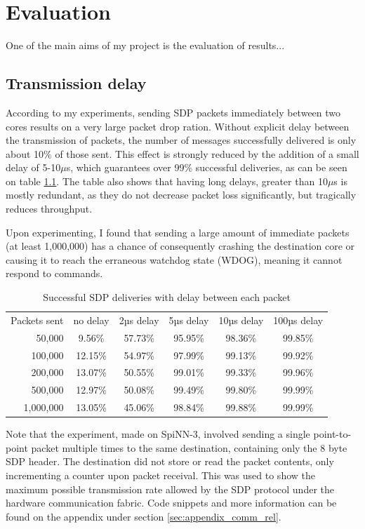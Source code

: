 \chapter{Evaluation}
\label{cha:eval}
One of the main aims of my project is the evaluation of results...

\section{Transmission delay}
\label{sec:eval_comm_rel}

According to my experiments, sending SDP packets immediately between two cores results on a very large packet drop ration. Without explicit delay between the transmission of packets, the number of messages successfully delivered is only about 10\% of those sent. This effect is strongly reduced by the addition of a small delay of 5-10$\mu$s, which guarantees over 99\% successful deliveries, as can be seen on table \ref{table:sdp_deliveries}. The table also shows that having long delays, greater than 10$\mu$s is mostly redundant, as they do not decrease packet loss significantly, but tragically reduces throughput.

Upon experimenting, I found that sending a large amount of immediate packets (at least 1,000,000) has a chance of consequently crashing the destination core or causing it to reach the erraneous watchdog state (WDOG), meaning it cannot respond to commands.

\begin{table}
\begin{tabular}{ r | c | c | c | c | c }
Packets sent & no delay & 2µs delay & 5µs delay & 10µs delay & 100µs delay \\
50,000 & 9.56\% & 57.73\% & 95.95\% & 98.36\% & 99.85\% \\
100,000 & 12.15\% & 54.97\% & 97.99\% & 99.13\% & 99.92\% \\
200,000 & 13.07\% & 50.55\% & 99.01\% & 99.33\% & 99.96\% \\
500,000 & 12.97\% & 50.08\% & 99.49\% & 99.80\% & 99.99\% \\
1,000,000 & 13.05\% & 45.06\% & 98.84\% & 99.88\% & 99.99\% \\
\end{tabular}
\caption{Successful SDP deliveries with delay between each packet}
\label{table:sdp_deliveries}
\end{table}

Note that the experiment, made on SpiNN-3, involved sending a single point-to-point packet multiple times to the same destination, containing only the 8 byte SDP header. The destination did not store or read the packet contents, only incrementing a counter upon packet receival. This was used to show the maximum possible transmission rate allowed by the SDP protocol under the hardware communication fabric. Code snippets and more information can be found on the appendix under section \ref{sec:appendix_comm_rel}.

